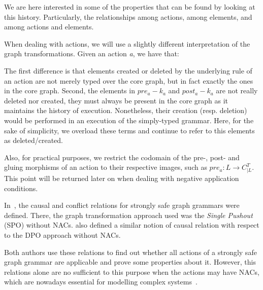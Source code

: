 We are here interested in some of the properties that can be found by looking at this history. Particularly, the relationships among actions, among elements, and among actions and elements.

\begin{remark} When dealing with actions, we will use a slightly different interpretation of the graph transformations. Given an action \emph{a}, we have that:
  
\hfill %

The first difference is that elements created or deleted by the underlying rule of an action are not merely typed over the core graph, but in fact exactly the ones in the core graph. Second, the elements in $pre_a - k_a$ and $post_a - k_a$ are not really deleted nor created, they must always be present in the core graph as it maintains the history of execution. Nonetheless, their creation (resp. deletion) would be performed in an execution of the simply-typed grammar. Here, for the sake of
  simplicity, we overload these terms and continue to refer to this elements as deleted/created.

  Also, for practical purposes, we restrict the codomain of the pre-, post- and gluing morphisms of an action to their respective images, such as $pre_a : L \rightarrow C^T_{|L}$. This point will be returned later on when dealing with negative application conditions.
\end{remark}

In~\cite{Ribeiro1996}, the causal and conflict relations for strongly safe graph grammars were defined. There, the graph transformation approach used was the \emph{Single Pushout} (SPO) without NACs. \cite{Corradini1996} also defined a similar notion of causal relation with respect to the DPO approach without NACs.

Both authors use these relations to find out whether all actions of a strongly safe graph grammar are applicable and prove some properties about it. However, this relations alone are no sufficient to this purpose when the actions may have NACs, which are nowadays essential for modelling complex systems~\cite{Corradini2014}.

